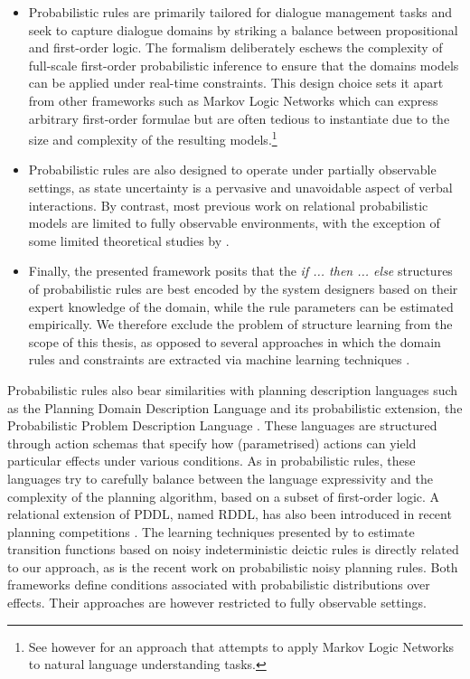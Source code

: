 \begin{itemize}

\item Probabilistic rules are primarily tailored for dialogue management tasks and seek to capture dialogue domains by striking a balance between propositional and first-order logic. The formalism deliberately eschews the complexity of full-scale first-order probabilistic inference to ensure that the domains models can be applied under real-time constraints. This design choice sets it apart from other frameworks such as Markov Logic Networks which can express arbitrary first-order formulae but are often tedious to instantiate due to the size and complexity of the resulting models.\footnote{See however \cite{Kennington:2012} for an approach that attempts to apply Markov Logic Networks to natural language understanding tasks.} 

\item Probabilistic rules are also designed to operate under partially observable settings, as state uncertainty is a pervasive and unavoidable aspect of verbal interactions.  By contrast, most previous work on relational probabilistic models are limited to fully observable environments, with the exception of some limited theoretical studies by \cite{Wang:2010,SannerK10}. 

\item Finally, the presented framework posits that the \textit{if ... then ... else} structures of probabilistic rules are best encoded by the system designers based on their expert knowledge of the domain, while the rule parameters can be estimated empirically. We therefore exclude the problem of structure learning from the scope of this thesis, as opposed to several approaches in which the domain rules and constraints are extracted via machine learning techniques \citep{PasulaZK07,Kok:2009}.

\end{itemize}

Probabilistic rules also bear similarities with planning description languages such as the Planning Domain Description Language \citep[PDDL, see ][]{mcdermott1998} and its probabilistic extension, the Probabilistic Problem Description Language \citep[PPDDL, see ][]{younes2004ppddl1}.  These languages are structured through action schemas that specify how (parametrised) actions can yield particular effects under various conditions. As in probabilistic rules, these languages try to carefully balance between the language expressivity and the complexity of the planning algorithm, based on a subset of first-order logic. A relational extension of PDDL, named RDDL, has also been introduced in recent planning competitions \citep{Sanner:RDDL}. The learning techniques presented by \cite{PasulaZK07} to estimate transition functions based on noisy indeterministic deictic rules is directly related to our approach, as is the recent work \cite{lang10jair} on probabilistic noisy planning rules.   Both frameworks define conditions associated with probabilistic distributions over effects. Their approaches are however restricted to fully observable settings. 

